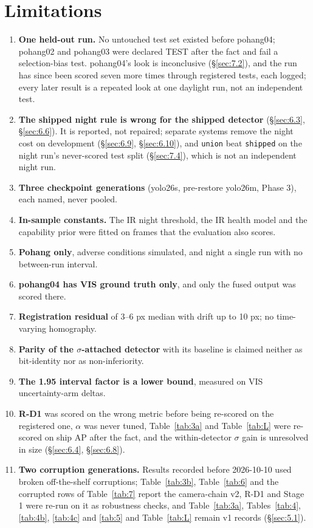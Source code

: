 \documentclass[10pt]{article}
\begin{document}
\section{Limitations}\label{sec:9}
\begin{enumerate}
\item \textbf{One held-out run.} No untouched test set existed before pohang04; pohang02 and pohang03 were declared TEST after the fact and fail a selection-bias test. pohang04's look is inconclusive (\S\ref{sec:7.2}), and the run has since been scored seven more times through registered tests, each logged; every later result is a repeated look at one daylight run, not an independent test.
\item \textbf{The shipped night rule is wrong for the shipped detector} (\S\ref{sec:6.3}, \S\ref{sec:6.6}). It is reported, not repaired; separate systems remove the night cost on development (\S\ref{sec:6.9}, \S\ref{sec:6.10}), and \texttt{union} beat \texttt{shipped} on the night run's never-scored test split (\S\ref{sec:7.4}), which is not an independent night run.
\item \textbf{Three checkpoint generations} (yolo26s, pre-restore yolo26m, Phase 3), each named, never pooled.
\item \textbf{In-sample constants.} The IR night threshold, the IR health model and the capability prior were fitted on frames that the evaluation also scores.
\item \textbf{Pohang only}, adverse conditions simulated, and night a single run with no between-run interval.
\item \textbf{pohang04 has VIS ground truth only}, and only the fused output was scored there.
\item \textbf{Registration residual} of 3--6 px median with drift up to 10 px; no time-varying homography.
\item \textbf{Parity of the $\sigma$-attached detector} with its baseline is claimed neither as bit-identity nor as non-inferiority.
\item \textbf{The 1.95 interval factor is a lower bound}, measured on VIS uncertainty-arm deltas.
\item \textbf{R-D1} was scored on the wrong metric before being re-scored on the registered one, $\alpha$ was never tuned, Table~\ref{tab:3a} and Table~\ref{tab:L} were re-scored on ship AP after the fact, and the within-detector $\sigma$ gain is unresolved in size (\S\ref{sec:6.4}, \S\ref{sec:6.8}).
\item \textbf{Two corruption generations.} Results recorded before 2026-10-10 used broken off-the-shelf corruptions; Table~\ref{tab:3b}, Table~\ref{tab:6} and the corrupted rows of Table~\ref{tab:7} report the camera-chain v2, R-D1 and Stage 1 were re-run on it as robustness checks, and Table~\ref{tab:3a}, Tables~\ref{tab:4}, \ref{tab:4b}, \ref{tab:4c} and \ref{tab:5} and Table~\ref{tab:L} remain v1 records (\S\ref{sec:5.1}).

\end{enumerate}
\end{document}
